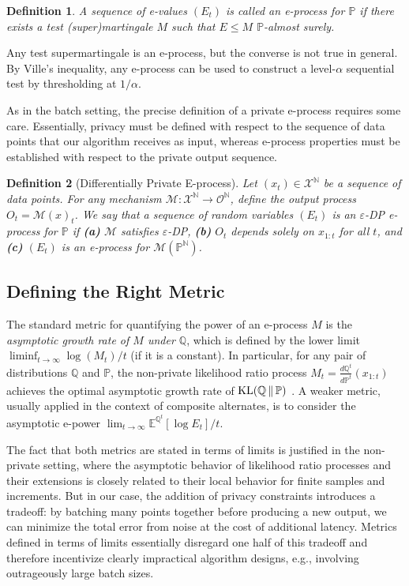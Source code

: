 \documentclass{article}
\DeclareMathOperator{\KLop}{KL}
\newcommand{\KL}[2]{%
  \mathchoice
    {\KLop\!\left(#1\,\middle\|\,#2\right)}%
    {\KLop(#1\,\Vert\,#2)}%
    {\KLop(#1\,\Vert\,#2)}%
    {\KLop(#1\,\Vert\,#2)}%
}
\newcommand{\Null}{\mathbb{P}}
\newcommand{\E}{\mathbb{E}}
\newcommand{\Alt}{\mathbb{Q}}
\newcommand{\M}{\mathcal{M}}
\newtheorem{definition}{Definition}[section]
\begin{document}
\begin{definition}
    A sequence of e-values $(E_t)$ 
    is called an \emph{e-process for $\Null$} if there exists a test (super)martingale $M$ such that $E \leq M$ $\Null$-almost surely.
\end{definition}

Any test supermartingale is an e-process, but the converse is not true in general. By Ville's inequality, any e-process can be used to construct a level-$\alpha$ sequential test by thresholding at $1/\alpha$.

As in the batch setting, the precise definition of a private e-process requires some care. Essentially, privacy must be defined with respect to the sequence of data points that our algorithm receives as input, whereas e-process properties must be established with respect to the private output sequence.

\begin{definition}[Differentially Private E-process]\label{def:dp-eproc}
    Let $(x_t) \in \mathcal{X}^\mathbb{N}$ be a sequence of data points. For any mechanism $\M : \mathcal{X}^\mathbb{N} \to \mathcal{O}^\mathbb{N}$, define the output process $O_t = \M(x)_t$. 
    We say that a sequence of random variables $(E_t)$
    is an $\varepsilon$-DP e-process for $\Null$ if \textbf{(a)} $\M$ satisfies $\varepsilon$-DP, \textbf{(b)} $O_t$ depends solely on $x_{1:t}$ for all $t$, and \textbf{(c)} $(E_t)$ is an e-process for $\M(\Null^\mathbb{N})$.
\end{definition}

\subsection{Defining the Right Metric}

The standard metric for quantifying the power of an e-process $M$ is the \emph{asymptotic growth rate of $M$ under $\Alt$}, which is defined by the lower limit $\liminf_{t \to \infty} \log(M_t)/t$ (if it is a constant). In particular, for any pair of distributions $\Alt$ and $\Null$, the non-private likelihood ratio process $M_t = \frac{d\Alt^t}{d\Null^t}(x_{1:t})$ achieves the optimal asymptotic growth rate of $\KL{\Alt}{\Null}$
. A weaker metric, usually applied in the context of composite alternates, is to consider the asymptotic e-power $\lim_{t \to\infty} \E^{\Alt^t}[\log E_t]/t$.

The fact that both metrics are stated in terms of limits is justified in the non-private setting, where the asymptotic behavior of likelihood ratio processes and their extensions is closely related to their local behavior for finite samples and increments. But in our case, the addition of privacy constraints introduces a tradeoff: by batching many points together before producing a new output, we can minimize the total error from noise at the cost of additional latency. Metrics defined in terms of limits essentially disregard one half of this tradeoff and therefore incentivize clearly impractical algorithm designs, e.g., involving outrageously large batch sizes.
\end{document}

